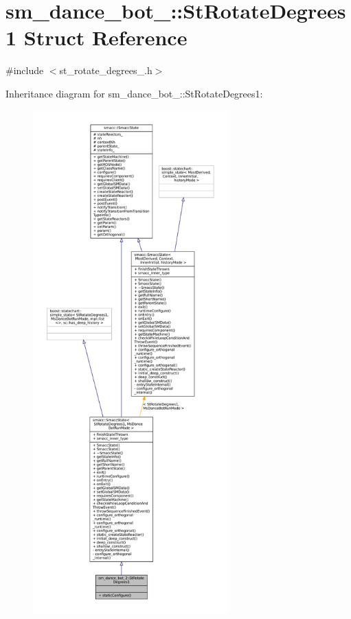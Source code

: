 \hypertarget{structsm__dance__bot__2_1_1StRotateDegrees1}{}\section{sm\+\_\+dance\+\_\+bot\+\_\+:\+:St\+Rotate\+Degrees1 Struct Reference}
\label{structsm__dance__bot__2_1_1StRotateDegrees1}


{\ttfamily \#include $<$st\+\_\+rotate\+\_\+degrees\+\_.\+h$>$}



Inheritance diagram for sm\+\_\+dance\+\_\+bot\+\_\+:\+:St\+Rotate\+Degrees1\+:
\nopagebreak
\begin{figure}[H]
\begin{center}
\leavevmode
\includegraphics[height=550pt]{structsm__dance__bot__2_1_1StRotateDegrees1__inherit__graph}
\end{center}
\end{figure}


